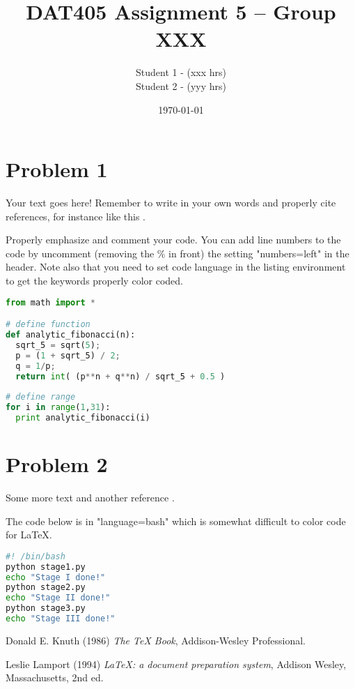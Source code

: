 \documentclass{article}
\title{DAT405 Assignment 5 -- Group XXX}
\author{Student 1 - (xxx hrs) \\[2pt]Student 2 - (yyy hrs)}
\date{\today}
\begin{document}
\maketitle

\section*{Problem 1}

Your text goes here! Remember to write in your own words and properly cite references, for instance like this \cite{myref1}. 

Properly emphasize and comment your code. You can add line numbers to the code by uncomment (removing the \% in front) the setting "numbers=left" in the header. 
Note also that you need to set code language in the listing environment to get the keywords properly color coded.


\begin{lstlisting}[label={list:first},language=Python,caption=Sample Python code -- Fibonacci sequence.]
from math import *

# define function 
def analytic_fibonacci(n):
  sqrt_5 = sqrt(5);
  p = (1 + sqrt_5) / 2;
  q = 1/p;
  return int( (p**n + q**n) / sqrt_5 + 0.5 )
 
# define range
for i in range(1,31):
  print analytic_fibonacci(i)
\end{lstlisting}

\pagebreak
\section*{Problem 2}
Some more text and another reference \cite{myref2}.

The code below is in "language=bash" which is somewhat difficult to color code for LaTeX.

\begin{lstlisting}[label={list:second},language=bash,caption=Sample Bash code]
#! /bin/bash
python stage1.py
echo "Stage I done!"
python stage2.py
echo "Stage II done!"
python stage3.py
echo "Stage III done!"
\end{lstlisting}

\begin{thebibliography}{9}
Donald E. Knuth (1986) \emph{The \TeX{} Book}, Addison-Wesley Professional.

Leslie Lamport (1994) \emph{\LaTeX: a document preparation system}, Addison
Wesley, Massachusetts, 2nd ed.
\end{thebibliography}
\end{document}
